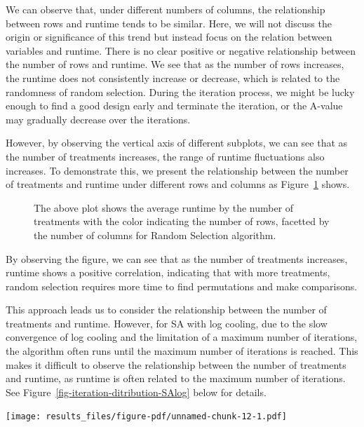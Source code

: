 \documentclass[
  a4paper,
  oneside,
  openany,
  12pt,
  onecolumn]{book}
\theoremstyle{definition}
\theoremstyle{definition}
\theoremstyle{plain}
\theoremstyle{remark}
\begin{document}
We can observe that, under different numbers of columns, the
relationship between rows and runtime tends to be similar. Here, we will
not discuss the origin or significance of this trend but instead focus
on the relation between variables and runtime. There is no clear
positive or negative relationship between the number of rows and
runtime. We see that as the number of rows increases, the runtime does
not consistently increase or decrease, which is related to the
randomness of random selection. During the iteration process, we might
be lucky enough to find a good design early and terminate the iteration,
or the A-value may gradually decrease over the iterations.

However, by observing the vertical axis of different subplots, we can
see that as the number of treatments increases, the range of runtime
fluctuations also increases. To demonstrate this, we present the
relationship between the number of treatments and runtime under
different rows and columns as Figure~\ref{fig-TvTRS} shows.

\begin{figure}


\caption{\label{fig-TvTRS}The above plot shows the average runtime by
the number of treatments with the color indicating the number of rows,
facetted by the number of columns for Random Selection algorithm.}

\end{figure}%

By observing the figure, we can see that as the number of treatments
increases, runtime shows a positive correlation, indicating that with
more treatments, random selection requires more time to find
permutations and make comparisons.

This approach leads us to consider the relationship between the number
of treatments and runtime. However, for SA with log cooling, due to the
slow convergence of log cooling and the limitation of a maximum number
of iterations, the algorithm often runs until the maximum number of
iterations is reached. This makes it difficult to observe the
relationship between the number of treatments and runtime, as runtime is
often related to the maximum number of iterations. See
Figure~\ref{fig-iteration-ditribution-SAlog} below for details.

\texttt{[image: results\_files/figure-pdf/unnamed-chunk-12-1.pdf]}
\end{document}

